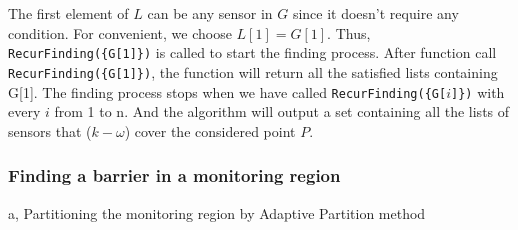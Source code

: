 
The first element of $L$ can be any sensor in $G$ since it doesn't require any condition. For convenient, we choose $L[1]=G[1]$. Thus, {\tt RecurFinding(\{G[1]\})} is called to start the finding process. After function call {\tt RecurFinding(\{G[1]\})}, the function will return all the satisfied lists containing G[1]. The finding process stops when we have called {\tt RecurFinding(\{G[$i$]\})} with every $i$ from 1 to n. And the algorithm will output a set containing all the lists of sensors that ($k-\omega$) cover the considered point $P$.

\subsubsection{Finding a barrier in a monitoring region}


a, Partitioning the monitoring region by Adaptive Partition method

\label{subsection1}


